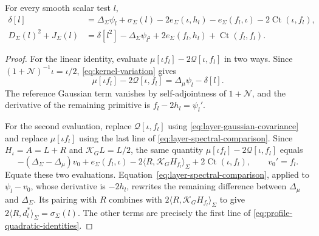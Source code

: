 \begin{lemma}\label{lem:profile-quadratics}
 For every smooth scalar test $l$,
 \begin{equation}\label{eq:profile-quadratic-identities}
 \begin{aligned}
  \delta[l]
   &=\Delta_\Sigma\psi_l+\sigma_\Sigma(l)
      -2e_\Sigma(\iota,h_l)-e_\Sigma(f_l,\iota)
      -2\operatorname{Ct}(\iota,f_l),\\
  D_\Sigma(l)^2+J_\Sigma(l)
   &=\delta[l^2]-\Delta_\Sigma\psi_{l^2}
      +2e_\Sigma(f_l,h_l)+\operatorname{Ct}(f_l,f_l).
 \end{aligned}
 \end{equation}
\end{lemma}

\begin{proof}
For the linear identity, evaluate $\mu[\iota f_l]-2\mathcal{Q}[\iota,f_l]$ in two ways. Since $(1+\mathcal{N})^{-1}\iota=\iota/2$, \eqref{eq:kernel-variation} gives
\[
 \mu[\iota f_l]-2\mathcal{Q}[\iota,f_l]
    =\Delta_\mu\psi_l-\delta[l].
\]
The reference Gaussian term vanishes by self-adjointness of $1+\mathcal{N}$, and the derivative of the remaining primitive is $f_l-2h_l=\psi_l'$.

For the second evaluation, replace $\mathcal{Q}[\iota,f_l]$ using \eqref{eq:layer-gaussian-covariance} and replace $\mu[\iota f_l]$ using the last line of \eqref{eq:layer-spectral-comparison}. Since $H_\iota=A=L+R$ and $\mathcal{K}_GL=L/2$, the same quantity $\mu[\iota f_l]-2\mathcal{Q}[\iota,f_l]$ equals
\[
 -(\Delta_\Sigma-\Delta_\mu)v_0+e_\Sigma(f_l,\iota)
   -2\langle R,\mathcal{K}_GH_{f_l}\rangle_\Sigma
   +2\operatorname{Ct}(\iota,f_l),\qquad v_0'=f_l.
\]
Equate these two evaluations. Equation~\eqref{eq:layer-spectral-comparison}, applied to $\psi_l-v_0$, whose derivative is $-2h_l$, rewrites the remaining difference between $\Delta_\mu$ and $\Delta_\Sigma$. Its pairing with $R$ combines with $2\langle R,\mathcal{K}_GH_{f_l}\rangle_\Sigma$ to give $2\langle R,d_l^*\rangle_\Sigma=\sigma_\Sigma(l)$. The other terms are precisely the first line of \eqref{eq:profile-quadratic-identities}.


\end{proof}
